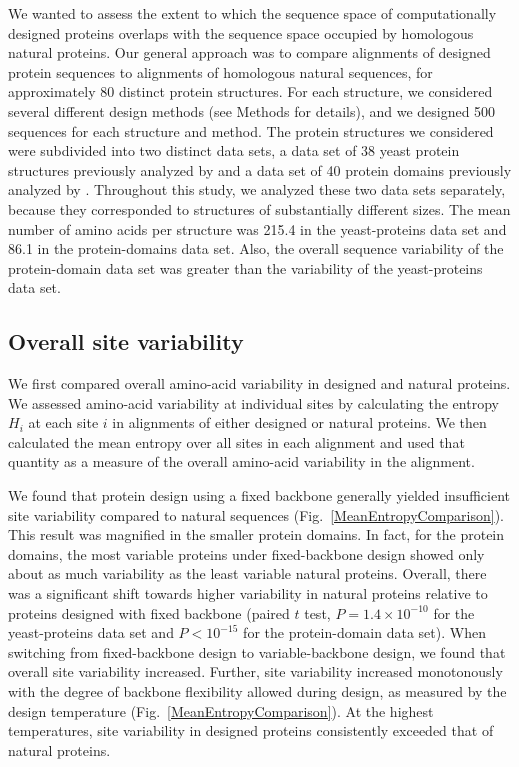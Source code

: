 \documentclass[12pt]{article}
\begin{document}
We wanted to assess the extent to which the sequence space of computationally designed proteins overlaps with the sequence space occupied by homologous natural proteins. Our general approach was to compare alignments of designed protein sequences to alignments of homologous natural sequences, for approximately 80 distinct protein structures. For each structure, we considered several different design methods (see Methods for details), and we designed 500 sequences for each structure and method. The protein structures we considered were subdivided into two distinct data sets, a data set of 38 yeast protein structures previously analyzed by \citet{Ramsey2011} and a data set of 40 protein domains previously analyzed by \citet{OllikainenKortemme}. Throughout this study, we analyzed these two data sets separately, because they corresponded to structures of substantially different sizes. The mean number of amino acids per structure was 215.4 in the yeast-proteins data set and 86.1 in the protein-domains data set. Also, the overall sequence variability of the protein-domain data set was greater than the variability of the yeast-proteins data set. 

\subsection{Overall site variability}
\label{SiteVariability}

We first compared overall amino-acid variability in designed and natural proteins. We assessed amino-acid variability at individual sites by calculating the entropy $H_i$ at each site $i$ in alignments of either designed or natural proteins. We then calculated the mean entropy over all sites in each alignment and used that quantity as a measure of the overall amino-acid variability in the alignment.

We found that protein design using a fixed backbone generally yielded insufficient site variability compared to natural sequences (Fig.~\ref{MeanEntropyComparison}).  This result was magnified in the smaller protein domains. In fact, for the protein domains, the most variable proteins under fixed-backbone design showed only about as much variability as the least variable natural proteins. Overall, there was a significant shift towards higher variability in natural proteins relative to proteins designed with fixed backbone (paired $t$ test, $P = 1.4\times10^{-10}$ for the yeast-proteins data set and $P<10^{-15}$ for the protein-domain data set). When switching from fixed-backbone design to variable-backbone design, we found that overall site variability increased. Further, site variability increased monotonously with the degree of backbone flexibility allowed during design, as measured by the design temperature (Fig.~\ref{MeanEntropyComparison}). At the highest temperatures, site variability in designed proteins consistently exceeded that of natural proteins. 
\end{document}
